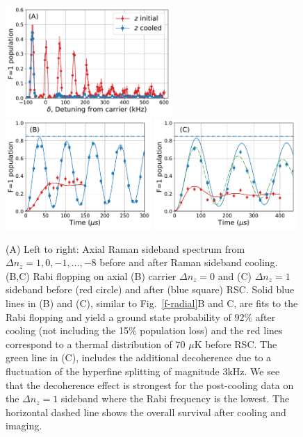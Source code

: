 \documentclass[aps,prl,twocolumn,groupedaddress]{revtex4-1}
\begin{document}
\begin{figure}
  \includegraphics[height=4.2cm]{imgs/spectrum_a1.pdf}
  \includegraphics[height=4.2cm]{imgs/rabi_flop_a1_0.pdf}
  \includegraphics[height=4.2cm]{imgs/rabi_flop_a1_p1.pdf}
  \caption{(A) Left to right: Axial Raman sideband spectrum from $\Delta n_z=1,0,-1,\ldots,-8$    before and after Raman sideband cooling.
    (B,C) Rabi flopping on axial (B) carrier $\Delta n_z=0$  and (C) $\Delta n_z=1$ sideband
    before (red circle) and after (blue square) RSC.
    Solid blue lines in (B) and (C), similar to Fig.~\ref{f-radial}B and C, are fits to the Rabi flopping and yield a ground state probability of $92$\% after cooling (not including the 15\% population loss) and
    the red lines correspond to a thermal distribution of $70$ $\mu$K before RSC.
    The green line in (C), includes the additional decoherence due to a fluctuation of the hyperfine splitting of magnitude 3kHz. %
    We see that the decoherence effect is strongest for the post-cooling data on
    the $\Delta n_z=1$ sideband where the Rabi frequency is the lowest.
    The horizontal dashed line shows the overall survival after cooling and imaging.
    \label{f-axial}}
\end{figure}
\end{document}
